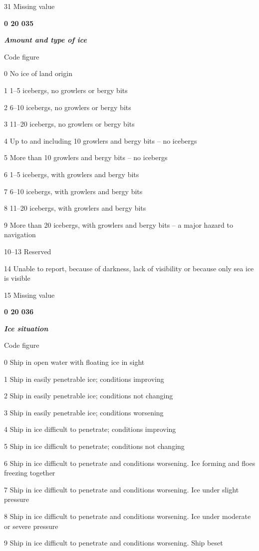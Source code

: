 31 Missing value

\textbf{0 20 035}

\emph{\textbf{Amount and type of ice}}

Code figure

0 No ice of land origin

1 1--5 icebergs, no growlers or bergy bits

2 6--10 icebergs, no growlers or bergy bits

3 11--20 icebergs, no growlers or bergy bits

4 Up to and including 10 growlers and bergy bits -- no icebergs

5 More than 10 growlers and bergy bits -- no icebergs

6 1--5 icebergs, with growlers and bergy bits

7 6--10 icebergs, with growlers and bergy bits

8 11--20 icebergs, with growlers and bergy bits

9 More than 20 icebergs, with growlers and bergy bits -- a major hazard to navigation

10--13 Reserved

14 Unable to report, because of darkness, lack of visibility or because only sea ice is visible

15 Missing value

\textbf{0 20 036}

\emph{\textbf{Ice situation}}

Code figure

0 Ship in open water with floating ice in sight

1 Ship in easily penetrable ice; conditions improving

2 Ship in easily penetrable ice; conditions not changing

3 Ship in easily penetrable ice; conditions worsening

4 Ship in ice difficult to penetrate; conditions improving

5 Ship in ice difficult to penetrate; conditions not changing

6 Ship in ice difficult to penetrate and conditions worsening. Ice forming and floes freezing together

7 Ship in ice difficult to penetrate and conditions worsening. Ice under slight pressure

8 Ship in ice difficult to penetrate and conditions worsening. Ice under moderate or severe pressure

9 Ship in ice difficult to penetrate and conditions worsening. Ship beset

